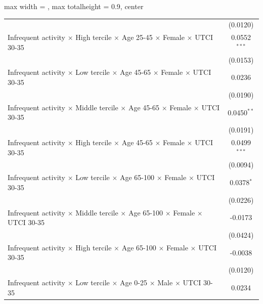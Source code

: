 \begin{table}[htbp]
\begin{adjustbox}{max width = \textwidth, max totalheight = 0.9\textheight, center}
\begin{tabular}{lc}
                                                                                                                 & (0.0120)\\   
         Infrequent activity $\times$ High tercile $\times$ Age 25-45 $\times$ Female $\times$ UTCI 30-35        & 0.0552$^{***}$\\   
                                                                                                                 & (0.0153)\\   
         Infrequent activity $\times$ Low tercile $\times$ Age 45-65 $\times$ Female $\times$ UTCI 30-35         & 0.0236\\   
                                                                                                                 & (0.0190)\\   
         Infrequent activity $\times$ Middle tercile $\times$ Age 45-65 $\times$ Female $\times$ UTCI 30-35      & 0.0450$^{**}$\\   
                                                                                                                 & (0.0191)\\   
         Infrequent activity $\times$ High tercile $\times$ Age 45-65 $\times$ Female $\times$ UTCI 30-35        & 0.0499$^{***}$\\   
                                                                                                                 & (0.0094)\\   
         Infrequent activity $\times$ Low tercile $\times$ Age 65-100 $\times$ Female $\times$ UTCI 30-35        & 0.0378$^{*}$\\   
                                                                                                                 & (0.0226)\\   
         Infrequent activity $\times$ Middle tercile $\times$ Age 65-100 $\times$ Female $\times$ UTCI 30-35     & -0.0173\\   
                                                                                                                 & (0.0424)\\   
         Infrequent activity $\times$ High tercile $\times$ Age 65-100 $\times$ Female $\times$ UTCI 30-35       & -0.0038\\   
                                                                                                                 & (0.0120)\\   
         Infrequent activity $\times$ Low tercile $\times$ Age 0-25 $\times$ Male $\times$ UTCI 30-35            & 0.0234\\   

\end{tabular}
\end{adjustbox}
\end{table}
